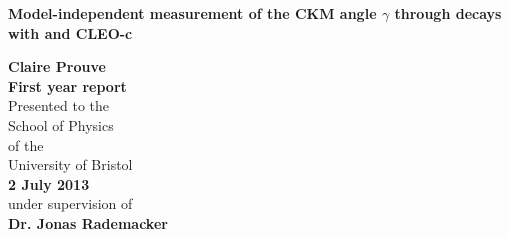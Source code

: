 \titlehead{%
} %
\titlefoot{%
}

\newsavebox{\Prof}

\begin{titlepage}
\begin{center}
\hbox{} %
\vspace*{2.5cm}
{\Huge\bfseries Model-independent measurement of the CKM angle $\gamma $ through \BToDK decays with \lhcb and CLEO-c \par}
\vskip 1.5cm
\large{ \textbf{Claire Prouve}}\normalsize\\
\vspace{2.cm}
\large{\textbf{First year report}}\normalsize\\
\vspace*{1.5cm}
Presented to the \\
School of Physics\\
of the \\
University of Bristol\\

 \textbf{2 July 2013}\\%
  under supervision of\\
\textbf{Dr. Jonas Rademacker}\\
\vspace*{0.5cm}
\end{center}
\vspace*{1.3cm}
\end{titlepage}
